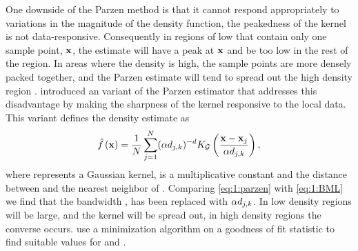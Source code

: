 One downside of the Parzen method is that it cannot respond appropriately to variations in the magnitude of the density function, \ie the peakedness of the kernel is not data-responsive. Consequently in regions of low \varDensityFunction{\varPattern} that contain only one sample point, $\varPattern$, the estimate will have a peak at $\varPattern$ and be too low in the rest of the region. In areas where the density is high, the sample points are more densely packed together, and the Parzen estimate will tend to spread out the high density region \cite{breiman1977variable}. \citeauthor{breiman1977variable} introduced an variant of the Parzen estimator that addresses this disadvantage by making the sharpness of the kernel responsive to the local data. This variant defines the density estimate as
\begin{equation}\label{eq:1:BML}
 	\varEstimatedDensityFunction{\varPattern} = \frac{1}{\varNumPatterns} \sum_{j = 1}^{\varNumPatterns} (\varBMLconstant \varKNNDistance{j}{k})^{-\varDim} \varKernel[\varGaussian]{\frac{\varPattern - \varPattern[j]}{\varBMLconstant \varKNNDistance{j}{k}}},
\end{equation} 
%
where \varKernel[\varGaussian]{\cdot} represents a Gaussian kernel, \varBMLconstant is a multiplicative constant and  the distance between \varPattern[j] and the \KNNK nearest neighbor of \varPattern[j]. Comparing \cref{eq:1:parzen} with \eqref{eq:1:BML} we find that the bandwidth \varBandwidth, has been replaced with $\alpha d_{j, k}$.  In low density regions  will be large, and the kernel will be spread out, in high density regions the converse occurs. \citeauthor{breiman1977variable} use a minimization algorithm on a goodness of fit statistic to find suitable values for \KNNK and \varBMLconstant.

